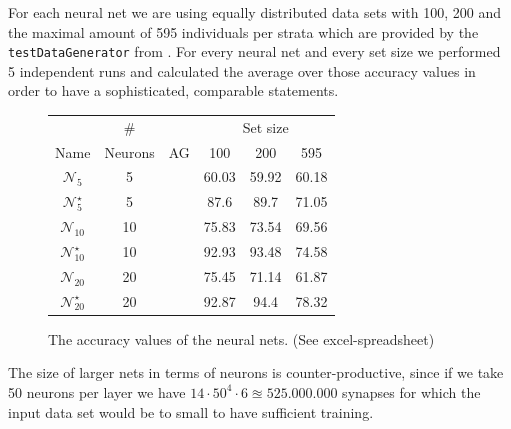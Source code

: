 \documentclass[runningheads]{llncs}
\newcommand{\cmark}{\ding{51}}%
\newcommand{\xmark}{\ding{55}}%
\begin{document}
	For each neural net we are using equally distributed data sets with 100, 200 and the maximal amount of 595 individuals per strata which are provided by the \texttt{testDataGenerator} from . For every neural net and every set size we performed 5 independent runs and calculated the average over those accuracy values in order to have a sophisticated, comparable statements. 
	\setlength\tabcolsep{.2cm}
	\begin{figure}[H]
	\centering
	\begin{tabular}{|c|c|c|c|c|c|}
		\hline
		                         &   \#    &        & \multicolumn{3}{c|}{Set size} \\
		          Name           & Neurons &   AG   &  100  &  200  &      595      \\ \hline
		    $\mathcal{N}_5$      &    5    & \xmark & 60.03 & 59.92 &     60.18     \\
		 $\mathcal{N}_5^\star$   &    5    & \cmark & 87.6  & 89.7  &     71.05     \\
		   $\mathcal{N}_{10}$    &   10    & \xmark & 75.83 & 73.54 &     69.56     \\
		$\mathcal{N}_{10}^\star$ &   10    & \cmark & 92.93 & 93.48 &     74.58     \\		
		   $\mathcal{N}_{20}$    &   20    & \xmark & 75.45 & 71.14 &     61.87     \\
		$\mathcal{N}_{20}^\star$ &   20    & \cmark & 92.87 & 94.4  &     78.32     \\ \hline
	\end{tabular}
	\caption{The accuracy values of the neural nets. (See excel-spreadsheet)}
	\label{tab: nn-accuracy}
	\end{figure}

	The size of larger nets in terms of neurons is counter-productive, since if we take 50 neurons per layer we have $14 \cdot 50^4 \cdot 6 \approxeq 525.000.000$ synapses for which the input data set would be to small to have sufficient training.\\
\end{document}

